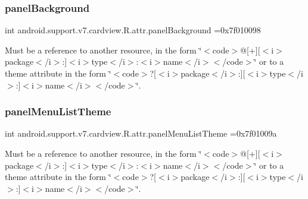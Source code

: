 \subsubsection{\texorpdfstring{panel\+Background}{panelBackground}}
{\footnotesize\ttfamily int android.\+support.\+v7.\+cardview.\+R.\+attr.\+panel\+Background =0x7f010098\hspace{0.3cm}{\ttfamily [static]}}

Must be a reference to another resource, in the form \char`\"{}$<$code$>$@\mbox{[}+\mbox{]}\mbox{[}$<$i$>$package$<$/i$>$\+:\mbox{]}$<$i$>$type$<$/i$>$\+:$<$i$>$name$<$/i$>$$<$/code$>$\char`\"{} or to a theme attribute in the form \char`\"{}$<$code$>$?\mbox{[}$<$i$>$package$<$/i$>$\+:\mbox{]}\mbox{[}$<$i$>$type$<$/i$>$\+:\mbox{]}$<$i$>$name$<$/i$>$$<$/code$>$\char`\"{}. \mbox{\label{classandroid_1_1support_1_1v7_1_1cardview_1_1R_1_1attr_ae76b891c2296dc0263664453f122e497}} 
\subsubsection{\texorpdfstring{panel\+Menu\+List\+Theme}{panelMenuListTheme}}
{\footnotesize\ttfamily int android.\+support.\+v7.\+cardview.\+R.\+attr.\+panel\+Menu\+List\+Theme =0x7f01009a\hspace{0.3cm}{\ttfamily [static]}}

Must be a reference to another resource, in the form \char`\"{}$<$code$>$@\mbox{[}+\mbox{]}\mbox{[}$<$i$>$package$<$/i$>$\+:\mbox{]}$<$i$>$type$<$/i$>$\+:$<$i$>$name$<$/i$>$$<$/code$>$\char`\"{} or to a theme attribute in the form \char`\"{}$<$code$>$?\mbox{[}$<$i$>$package$<$/i$>$\+:\mbox{]}\mbox{[}$<$i$>$type$<$/i$>$\+:\mbox{]}$<$i$>$name$<$/i$>$$<$/code$>$\char`\"{}. \mbox{\label{classandroid_1_1support_1_1v7_1_1cardview_1_1R_1_1attr_a4b602f80daf4caaeaa1f7a222674fff1}} 
